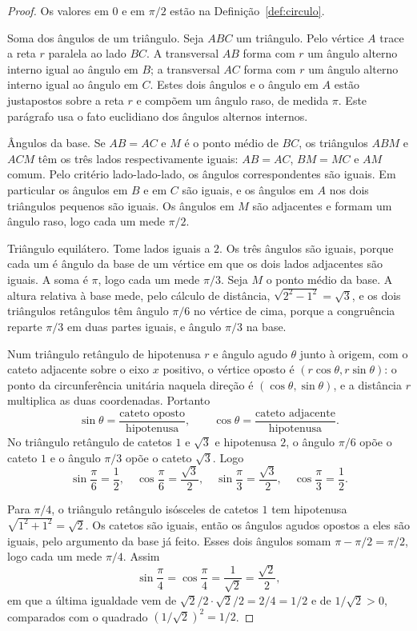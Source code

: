 \documentclass[11pt,a4paper]{article}
\begin{document}
\begin{proof}
Os valores em $0$ e em $\pi/2$ estão na Definição~\ref{def:circulo}.

Soma dos ângulos de um triângulo. Seja $ABC$ um triângulo. Pelo vértice $A$ trace a reta $r$ paralela ao lado $BC$. A transversal $AB$ forma com $r$ um ângulo alterno interno igual ao ângulo em $B$; a transversal $AC$ forma com $r$ um ângulo alterno interno igual ao ângulo em $C$. Estes dois ângulos e o ângulo em $A$ estão justapostos sobre a reta $r$ e compõem um ângulo raso, de medida $\pi$. Este parágrafo usa o fato euclidiano dos ângulos alternos internos.

Ângulos da base. Se $AB=AC$ e $M$ é o ponto médio de $BC$, os triângulos $ABM$ e $ACM$ têm os três lados respectivamente iguais: $AB=AC$, $BM=MC$ e $AM$ comum. Pelo critério lado-lado-lado, os ângulos correspondentes são iguais. Em particular os ângulos em $B$ e em $C$ são iguais, e os ângulos em $A$ nos dois triângulos pequenos são iguais. Os ângulos em $M$ são adjacentes e formam um ângulo raso, logo cada um mede $\pi/2$.

Triângulo equilátero. Tome lados iguais a $2$. Os três ângulos são iguais, porque cada um é ângulo da base de um vértice em que os dois lados adjacentes são iguais. A soma é $\pi$, logo cada um mede $\pi/3$. Seja $M$ o ponto médio da base. A altura relativa à base mede, pelo cálculo de distância, $\sqrt{2^2-1^2}=\sqrt{3}$, e os dois triângulos retângulos têm ângulo $\pi/6$ no vértice de cima, porque a congruência reparte $\pi/3$ em duas partes iguais, e ângulo $\pi/3$ na base.

Num triângulo retângulo de hipotenusa $r$ e ângulo agudo $\theta$ junto à origem, com o cateto adjacente sobre o eixo $x$ positivo, o vértice oposto é $(r\cos\theta,r\sin\theta)$: o ponto da circunferência unitária naquela direção é $(\cos\theta,\sin\theta)$, e a distância $r$ multiplica as duas coordenadas. Portanto
\[
\sin\theta=\frac{\text{cateto oposto}}{\text{hipotenusa}},\qquad
\cos\theta=\frac{\text{cateto adjacente}}{\text{hipotenusa}}.
\]
No triângulo retângulo de catetos $1$ e $\sqrt{3}$ e hipotenusa $2$, o ângulo $\pi/6$ opõe o cateto $1$ e o ângulo $\pi/3$ opõe o cateto $\sqrt{3}$. Logo
\[
\sin\frac{\pi}{6}=\frac12,\quad
\cos\frac{\pi}{6}=\frac{\sqrt{3}}{2},\quad
\sin\frac{\pi}{3}=\frac{\sqrt{3}}{2},\quad
\cos\frac{\pi}{3}=\frac12.
\]

Para $\pi/4$, o triângulo retângulo isósceles de catetos $1$ tem hipotenusa $\sqrt{1^2+1^2}=\sqrt{2}$. Os catetos são iguais, então os ângulos agudos opostos a eles são iguais, pelo argumento da base já feito. Esses dois ângulos somam $\pi-\pi/2=\pi/2$, logo cada um mede $\pi/4$. Assim
\[
\sin\frac{\pi}{4}=\cos\frac{\pi}{4}=\frac{1}{\sqrt{2}}=\frac{\sqrt{2}}{2},
\]
em que a última igualdade vem de $\sqrt{2}/2\cdot\sqrt{2}/2=2/4=1/2$ e de $1/\sqrt{2}>0$, comparados com o quadrado $(1/\sqrt{2})^2=1/2$.
\end{proof}
\end{document}
